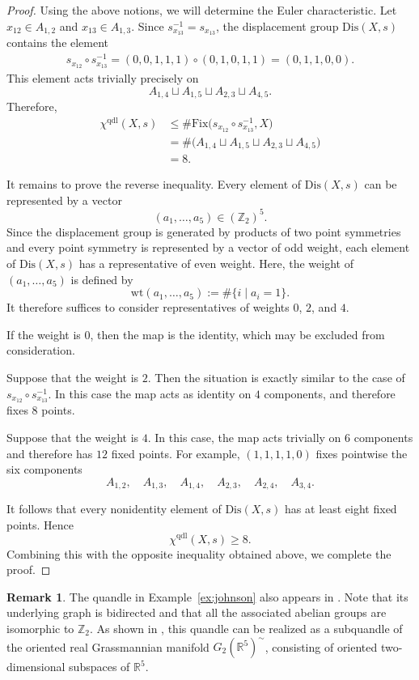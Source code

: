 \documentclass[12pt]{amsart}
\theoremstyle{definition}
\newtheorem{Rem}[Prop]{Remark}
\newcommand{\R}{{\mathbb R}}
\newcommand{\Z}{{\mathbb Z}}
\newcommand{\Fix}{\mathrm{Fix}}
\newcommand{\Dis}{\mathrm{Dis}}
\begin{document}
\begin{proof}
Using the above notions, we will determine the Euler characteristic. 
Let $x_{12}\in A_{1,2}$ and $x_{13}\in A_{1,3}$.
Since $s_{x_{13}}^{-1}=s_{x_{13}}$, the displacement group $\Dis(X,s)$ contains the element
\begin{align*}
s_{x_{12}}\circ s_{x_{13}}^{-1} =(0,0,1,1,1)\circ(0,1,0,1,1) =(0,1,1,0,0) . 
\end{align*}
This element acts trivially precisely on
\[
A_{1,4}\sqcup A_{1,5}\sqcup A_{2,3}\sqcup A_{4,5}.
\]
Therefore,
\begin{align*}
\chi^{\mathrm{qdl}}(X,s)
&\leq
\#\Fix\bigl(s_{x_{12}}\circ s_{x_{13}}^{-1},X\bigr)\\
&=
\#\bigl(
A_{1,4}\sqcup A_{1,5}\sqcup A_{2,3}\sqcup A_{4,5}
\bigr)\\
&=8.
\end{align*}

It remains to prove the reverse inequality.
Every element of $\Dis(X,s)$ can be represented by a vector
\[
(a_1,\ldots,a_5)\in(\Z_2)^5.
\]
Since the displacement group is generated by products of two point symmetries and every point symmetry is represented by a vector of odd weight, each element of $\Dis(X,s)$ has a representative of even weight.
Here, the weight of $(a_1,\ldots,a_5)$ is defined by
\[
\mathrm{wt}(a_1,\ldots,a_5)
:=\#\{i\mid a_i=1\}.
\]
It therefore suffices to consider representatives of weights $0$, $2$, and $4$.

If the weight is $0$, then the map is the identity, which may be excluded from consideration.

Suppose that the weight is $2$.
Then the situation is exactly similar to the case of $s_{x_{12}}\circ s_{x_{13}}^{-1}$. 
In this case the map acts as identity on $4$ components, and therefore fixes $8$ points. 

Suppose that the weight is $4$.
In this case, the map acts trivially on $6$ components and therefore has $12$ fixed points. 
For example, $(1,1,1,1,0)$ fixes pointwise the six components 
\[
A_{1,2},\quad
A_{1,3},\quad
A_{1,4},\quad
A_{2,3},\quad
A_{2,4},\quad
A_{3,4}.
\]

It follows that every nonidentity element of $\Dis(X,s)$ has at least eight fixed points.
Hence
\[
\chi^{\mathrm{qdl}}(X,s)\geq 8.
\]
Combining this with the opposite inequality obtained above, we complete the proof. 
\end{proof}

\begin{Rem}
The quandle in Example~\ref{ex:johnson} also appears in \cite{FT}.
Note that its underlying graph is bidirected and that all the associated
abelian groups are isomorphic to $\Z_2$.
As shown in \cite{FT}, this quandle can be realized as a subquandle of
the oriented real Grassmannian manifold $G_2(\R^5)^\sim$, 
consisting of oriented two-dimensional subspaces of $\R^5$. 
\end{Rem}
\end{document}
